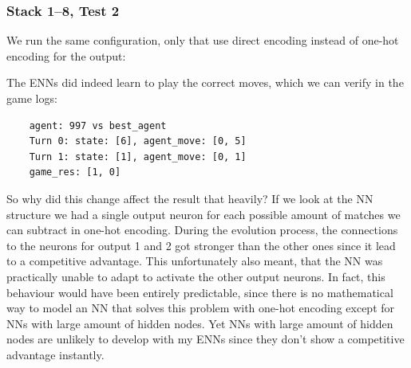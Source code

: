 \documentclass[11pt]{report}
\begin{document}
\begin{enumerate}
                \subsubsection{Stack 1--8, Test 2}
    We run the same configuration, only that use direct encoding instead of one-hot encoding for the output:
    \\
    \renewcommand{\csvpath}{../data/simple_nim/stack_8r/t_2/stats.csv} %
    \begin{center}
    \end{center}
    The ENNs did indeed learn to play the correct moves, which we can verify in the game logs:
    \begin{verbatim}
    agent: 997 vs best_agent
    Turn 0: state: [6], agent_move: [0, 5]
    Turn 1: state: [1], agent_move: [0, 1]
    game_res: [1, 0]
    \end{verbatim}
    So why did this change affect the result that heavily?
    If we look at the NN structure we had a single output neuron for each possible amount of matches we can subtract in one-hot encoding.
    During the evolution process, the connections to the neurons for output 1 and 2 got stronger than the other ones since it lead to a competitive advantage.
    This unfortunately also meant, that the NN was practically unable to adapt to activate the other output neurons.
    In fact, this behaviour would have been entirely predictable, since there is no mathematical way to model an NN that solves this problem with one-hot encoding except for NNs with large amount of hidden nodes.
    Yet NNs with large amount of hidden nodes are unlikely to develop with my ENNs since they don't show a competitive advantage instantly.

\end{enumerate}
\end{document}
